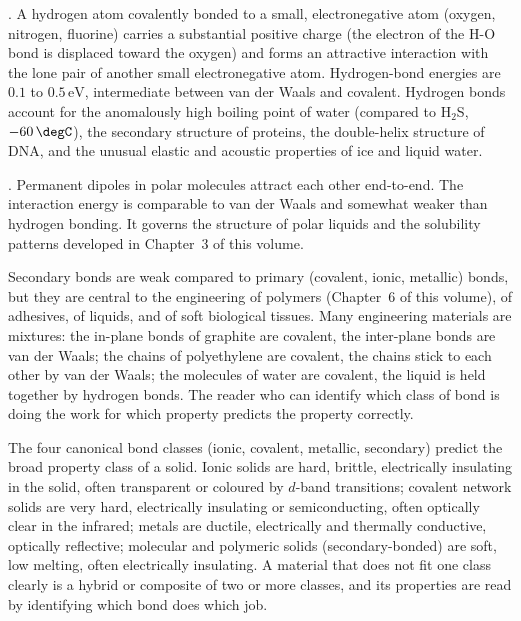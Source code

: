 . A hydrogen atom covalently bonded to a small,
electronegative atom (oxygen, nitrogen, fluorine) carries a
substantial positive charge (the electron of the H-O bond is
displaced toward the oxygen) and forms an attractive interaction with
the lone pair of another small electronegative atom. Hydrogen-bond
energies are $0.1$ to $0.5\,\text{eV}$, intermediate between van der
Waals and covalent. Hydrogen bonds account for the anomalously high
boiling point of water (compared to H$_2$S, $-60\,\degC$), the
secondary structure of proteins, the double-helix structure of DNA,
and the unusual elastic and acoustic properties of ice and liquid
water.

. Permanent dipoles in polar molecules
attract each other end-to-end. The interaction energy is comparable to
van der Waals and somewhat weaker than hydrogen bonding. It governs
the structure of polar liquids and the solubility patterns developed
in Chapter~3 of this volume.

Secondary bonds are weak compared to primary (covalent, ionic,
metallic) bonds, but they are central to the engineering of polymers
(Chapter~6 of this volume), of adhesives, of liquids, and of soft
biological tissues. Many engineering materials are mixtures: the
in-plane bonds of graphite are covalent, the inter-plane bonds are van
der Waals; the chains of polyethylene are covalent, the chains stick
to each other by van der Waals; the molecules of water are covalent,
the liquid is held together by hydrogen bonds. The reader who can
identify which class of bond is doing the work for which property
predicts the property correctly.

\begin{principle}
The four canonical bond classes (ionic, covalent, metallic, secondary)
predict the broad property class of a solid. Ionic solids are hard,
brittle, electrically insulating in the solid, often transparent or
coloured by $d$-band transitions; covalent network solids are very
hard, electrically insulating or semiconducting, often optically clear
in the infrared; metals are ductile, electrically and thermally
conductive, optically reflective; molecular and polymeric solids
(secondary-bonded) are soft, low melting, often electrically
insulating. A material that does not fit one class clearly is a hybrid
or composite of two or more classes, and its properties are read by
identifying which bond does which job.
\end{principle}

